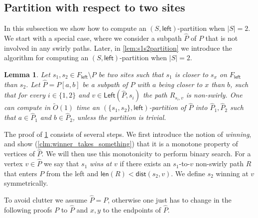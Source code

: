 \documentclass{article}
\newcommand{\Left}{\mathsf{Left}}
\newcommand{\leftside}{\mathsf{left}}
\newcommand{\dist}{\mathsf{dist}}
\newcommand{\len}{\mathsf{len}}
\newtheorem{lemma}{Lemma}
\newcommand{\Otild}{\tilde{O}}
\begin{document}
\subsection{Partition with respect to two sites}\label{sec:ns-partition}



In this subsection we show how to compute an $(S,\leftside)$-partition when $|S|=2$.
We start with a special case, where we consider a subpath $\hat P$ of $P$ that is not involved in any swirly paths.
Later, in \cref{lem:s1s2partition} we introduce the algorithm for computing an $(S,\leftside)$-partition when $|S|=2$.

\begin{lemma}\label{lem:out_partition_non-swirly}
Let $s_1,s_2\in F_{\leftside}\setminus P$ be two sites such that $s_1$ is closer to $s_x$ on $F_{\leftside}$ than $s_2$.
Let $\hat P=P[a,b]$ be a subpath of $P$ with $a$ being closer to $x$ than $b$, such that for every $i\in\{1,2\}$ and $v\in \Left(\hat P,s_i)$ the path $R_{s_i,v}$ is non-swirly.
One can compute in $\Otild(1)$ time an $(\{s_1,s_2\},\leftside)$-partition of $\hat P$ into $\hat P_1,\hat P_2$ such that $a\in \hat P_1$ and $b\in\hat P_2$, unless the partition is trivial.
\end{lemma}




The proof of \cref{lem:out_partition_non-swirly} consists of several steps.
We first introduce the notion of \emph{winning}, and show (\cref{clm:winner_takes_something}) that it is a monotone property of vertices of $\hat P$.
We will then use this monotonicity to perform binary search.
For a vertex $v\in \hat P$ we say that $s_1$ {\em wins at $v$} if there exists an $s_1$-to-$v$ non-swirly path $R$ that enters $P$ from the left and $\len(R)<\dist(s_2,v)$. We define $s_2$ winning at $v$ symmetrically.


To avoid clutter we assume $\hat P=P$, otherwise one just has to change in the following proofs $P$ to $\hat P$ and $x,y$ to the endpoints of $\hat P$.
\end{document}
